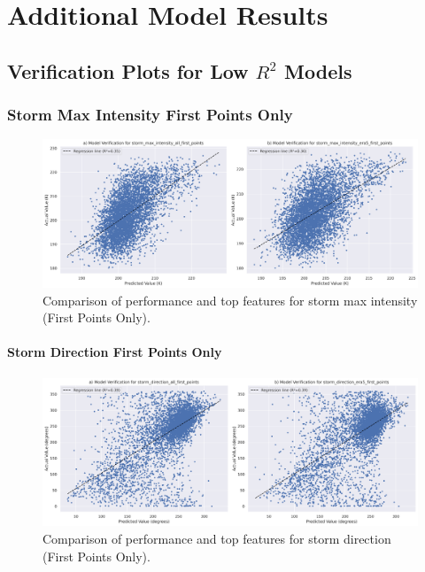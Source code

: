 \chapter{Additional Model Results}
\label{appn:modelresults}

\section{Verification Plots for Low $R^2$ Models}

\subsection{Storm Max Intensity First Points Only}

\begin{figure}[h]
    \centering
    \includegraphics[width=\textwidth]{../figures/generated/experiments/storm_max_intensity_first_points/storm_max_intensity_first_points_summary.png}
    \caption{Comparison of performance and top features for storm max intensity (First Points Only).}
    \label{fig:storm_max_intensity_first_points_summary}
\end{figure}

\subsubsection{Storm Direction First Points Only}

\begin{figure}[h]
    \centering
    \includegraphics[width=\textwidth]{../figures/generated/experiments/storm_direction_first_points/storm_direction_first_points_summary.png}
    \caption{Comparison of performance and top features for storm direction (First Points Only).}
    \label{fig:storm_direction_first_points_summary}
\end{figure}